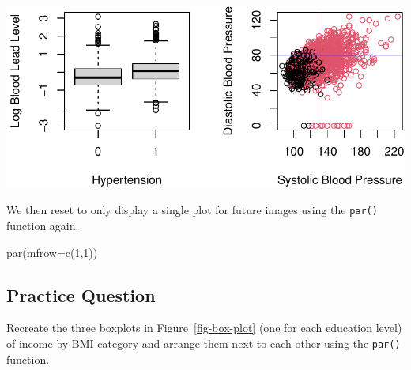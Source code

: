 \documentclass[
  letterpaper,
]{krantz}
\makeatletter
\newenvironment{Shaded}{\begin{snugshade}}{\end{snugshade}}
\newcommand{\AttributeTok}[1]{\textcolor[rgb]{0.40,0.45,0.13}{#1}}
\newcommand{\DecValTok}[1]{\textcolor[rgb]{0.68,0.00,0.00}{#1}}
\newcommand{\FunctionTok}[1]{\textcolor[rgb]{0.28,0.35,0.67}{#1}}
\newcommand{\NormalTok}[1]{\textcolor[rgb]{0.00,0.23,0.31}{#1}}
\newenvironment{kframe}{%
\medskip{}
\setlength{\fboxsep}{.8em}
 \def\at@end@of@kframe{}%
 \ifinner\ifhmode%
  \def\at@end@of@kframe{\end{minipage}}%
  \begin{minipage}{\columnwidth}%
 \fi\fi%
 \def\FrameCommand##1{\hskip\@totalleftmargin \hskip-\fboxsep
 \colorbox{shadecolor}{##1}\hskip-\fboxsep
     \hskip-\linewidth \hskip-\@totalleftmargin \hskip\columnwidth}%
 \MakeFramed {\advance\hsize-\width
   \@totalleftmargin\z@ \linewidth\hsize
   \@setminipage}}%
 {\par\unskip\endMakeFramed%
 \at@end@of@kframe}
\renewenvironment{Shaded}{\begin{kframe}}{\end{kframe}}
\makeatother
\begin{document}
\begin{center}
\includegraphics[width=1\textwidth,height=\textheight]{book/exploratory_analysis_files/figure-pdf/unnamed-chunk-20-1.pdf}
\end{center}

We then reset to only display a single plot for future images using the
\texttt{par()} function again.

\begin{Shaded}
\begin{Highlighting}[]
\FunctionTok{par}\NormalTok{(}\AttributeTok{mfrow=}\FunctionTok{c}\NormalTok{(}\DecValTok{1}\NormalTok{,}\DecValTok{1}\NormalTok{))}
\end{Highlighting}
\end{Shaded}

\subsection{Practice Question}\label{practice-question-7}

Recreate the three boxplots in Figure~\ref{fig-box-plot} (one for each
education level) of income by BMI category and arrange them next to each
other using the \texttt{par()} function.
\end{document}

